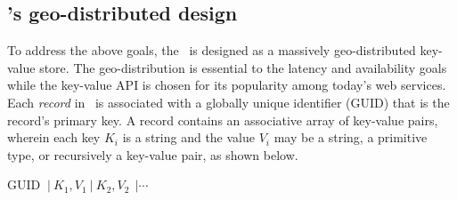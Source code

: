 \subsection{\auspice's geo-distributed design}
\label{sec:design_overview}

To address the above goals, the \auspice\  is designed as a massively geo-distributed key-value store. The geo-distribution is essential to the latency and availability goals while the key-value API is chosen for its popularity among today's web services. Each {\em record} in \auspice\ is associated with a globally unique identifier (GUID) that is the record's primary key. A record contains an associative array of key-value pairs, wherein each key $K_i$ is a string and the value $V_i$ may be a string, a primitive type, or recursively a key-value pair, as shown below.

GUID  $\ | \ K_1, V_1 \ | \ K_2, V_2 \ \ | \cdots $




